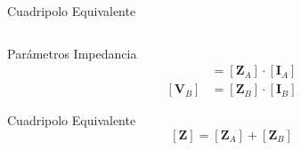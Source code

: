 \documentclass[xcolor={usenames,svgnames,dvipsnames}]{beamer}
\begin{document}
\begin{frame}[label={sec:org7523d8d}]{Cuadripolo Equivalente}
\begin{columns}
\begin{column}{0.35\columnwidth}
\begin{block}{Parámetros Impedancia}
\begin{align*}
  [\mathbf{V}_A] &= [\mathbf{Z}_A] \cdot [\mathbf{I}_A]\\
  [\mathbf{V}_B] &= [\mathbf{Z}_B] \cdot [\mathbf{I}_B]
\end{align*}
\end{block}

\begin{block}{Cuadripolo Equivalente}
\[
  \boxed{[\mathbf{Z}] = [\mathbf{Z}_A] + [\mathbf{Z}_B]}
\]
\end{block}
\end{column}
\end{columns}
\end{frame}
\end{document}
